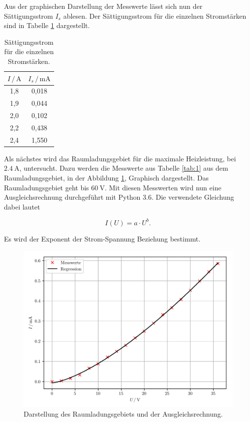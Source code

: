 Aus der graphischen Darstellung der Messwerte lässt sich nun der Sättigungsstrom
$I_s$ ablesen. Der Sättigungsstrom für die einzelnen Stromstärken sind in Tabelle
\ref{tab:2} dargestellt.

\begin{table}[H]
  \centering
  \caption{Sättigungsstrom für die einzelnen Stromstärken.}
  \label{tab:2}
  \begin{tabular}{c c}
    \toprule
    $I \, / \, \si{\ampere}$ & $I_s \, / \, \si{\milli\ampere}$ \\
    \midrule
    1,8 & 0,018  \\
    1,9 & 0,044  \\
    2,0 & 0,102  \\
    2,2 & 0,438  \\
    2,4 & 1,550  \\
    \bottomrule
  \end{tabular}
\end{table}

Als nächstes wird das Raumladungsgebiet für die maximale Heizleistung, bei $\SI{2.4}{\ampere}$,
untersucht. Dazu werden die Messwerte aus Tabelle \ref{tab:1} aus dem Raumladungsgebiet, in der Abbildung \ref{abb:7},
Graphisch dargestellt. Das Raumladungsgebiet geht bis $\SI{60}{\volt}$.
Mit diesen Messwerten wird nun eine Ausgleichsrechnung durchgeführt mit Python 3.6.
Die verwendete Gleichung dabei lautet

\begin{equation*}
  I(U) = a \cdot U^b.
\end{equation*}

Es wird der Exponent der Strom-Spannung Beziehung bestimmt.

\begin{figure}[H]
  \centering
  \includegraphics{plot2.pdf}
  \caption{Darstellung des Raumladungsgebiets und der Ausgleichsrechnung.}
  \label{abb:7}
\end{figure}

